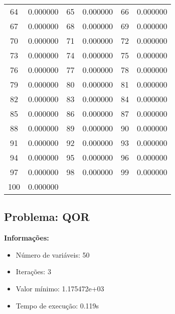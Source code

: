 \documentclass[12pt]{article}
\begin{document}
\begin{longtable}{@{}cc|cc|cc@{}}
64 & 0.000000 & 65 & 0.000000 & 66 & 0.000000 \\
67 & 0.000000 & 68 & 0.000000 & 69 & 0.000000 \\
70 & 0.000000 & 71 & 0.000000 & 72 & 0.000000 \\
73 & 0.000000 & 74 & 0.000000 & 75 & 0.000000 \\
76 & 0.000000 & 77 & 0.000000 & 78 & 0.000000 \\
79 & 0.000000 & 80 & 0.000000 & 81 & 0.000000 \\
82 & 0.000000 & 83 & 0.000000 & 84 & 0.000000 \\
85 & 0.000000 & 86 & 0.000000 & 87 & 0.000000 \\
88 & 0.000000 & 89 & 0.000000 & 90 & 0.000000 \\
91 & 0.000000 & 92 & 0.000000 & 93 & 0.000000 \\
94 & 0.000000 & 95 & 0.000000 & 96 & 0.000000 \\
97 & 0.000000 & 98 & 0.000000 & 99 & 0.000000 \\
100 & 0.000000 &  &  &  &  \\

\end{longtable}


\newpage            
\subsection{Problema: QOR}

\textbf{Informações:}
\begin{itemize}
\item Número de variáveis: 50
\item Iterações: 3
\item Valor mínimo: 1.175472e+03
\item Tempo de execução: 0.119s
\end{itemize}
\end{document}
